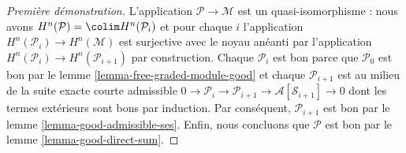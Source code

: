 \begin{proof}[Première démonstration]
\medskip\noindent
L'application $\mathcal{P} \to \mathcal{M}$ est un quasi-isomorphisme :
nous avons $H^n(\mathcal{P}) = \colim H^n(\mathcal{P}_i)$
et pour chaque $i$ l'application $H^n(\mathcal{P}_i) \to H^n(\mathcal{M})$
est surjective avec le noyau anéanti par l'application
$H^n(\mathcal{P}_i) \to H^n(\mathcal{P}_{i + 1})$ par construction.
Chaque $\mathcal{P}_i$ est bon parce que $\mathcal{P}_0$ est bon
par le lemme \ref{lemma-free-graded-module-good} et chaque $\mathcal{P}_{i + 1}$
est au milieu de la suite exacte courte admissible
$0 \to \mathcal{P}_i \to \mathcal{P}_{i + 1} \to
\mathcal{A}[\mathcal{S}_{i + 1}] \to 0$ dont les termes
extérieurs sont bons par induction. Par conséquent,
$\mathcal{P}_{i + 1}$ est bon par
le lemme \ref{lemma-good-admissible-ses}.
Enfin, nous concluons que $\mathcal{P}$ est bon par
le lemme \ref{lemma-good-direct-sum}.
\end{proof}

